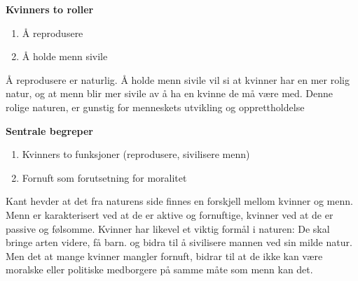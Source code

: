 \documentclass[11pt, a4paper]{article}
\newenvironment{sectionbox}[1][]{%
    \begin{sectionboxinner}
    \textbf{\large #1}
    \vspace{1pt}
    \newline
}{%
    \end{sectionboxinner}
}
\newenvironment{subsectionbox}[1][]{%
    \begin{subsectionboxinner}
    \textbf{#1}
    \vspace{3pt}
    \newline
}{%
    \end{subsectionboxinner}
}
\begin{document}
\begin{sectionbox}[Kvinners to roller]
\begin{enumerate}
    \item Å reprodusere
    \item Å holde menn sivile
\end{enumerate}

Å reprodusere er naturlig. Å holde menn sivile vil si at kvinner har en mer rolig natur, og at menn blir mer sivile av å ha en kvinne de må være med. Denne rolige naturen, er gunstig for menneskets utvikling og opprettholdelse

\begin{subsectionbox}[Sentrale begreper]
\begin{enumerate}
    \item Kvinners to funksjoner (reprodusere, sivilisere menn)
    \item Fornuft som forutsetning for moralitet
\end{enumerate}
\end{subsectionbox}

Kant hevder at det fra naturens side finnes en forskjell mellom kvinner og menn. Menn er karakterisert ved at de er aktive og fornuftige, kvinner ved at de er passive og følsomme. Kvinner har likevel et viktig formål i naturen: De skal bringe arten videre, få barn. og bidra til å sivilisere mannen ved sin milde natur. Men det at mange kvinner mangler fornuft, bidrar til at de ikke kan være moralske eller politiske medborgere på samme måte som menn kan det.
\end{sectionbox}
\end{document}
